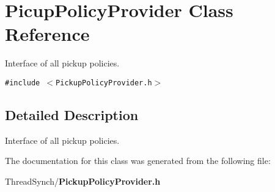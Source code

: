 \section{Picup\-Policy\-Provider Class Reference}
\label{class_picup_policy_provider}
Interface of all pickup policies.  


{\tt \#include $<$Pickup\-Policy\-Provider.h$>$}



\subsection{Detailed Description}
Interface of all pickup policies. 



The documentation for this class was generated from the following file:\begin{CompactItemize}
\item 
Thread\-Synch/{\bf Pickup\-Policy\-Provider.h}\end{CompactItemize}
